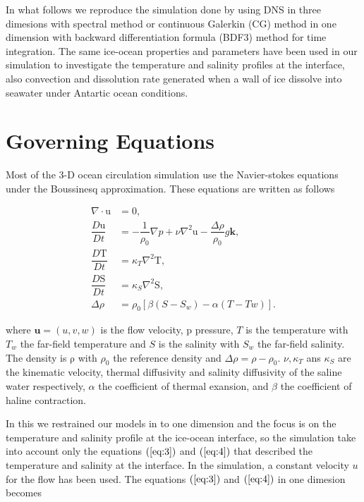 \documentclass[11pt,a4paper]{article}
\begin{document}
	 In what follows we reproduce the simulation done by \cite{gayen2016simulation} using DNS in three dimesions with spectral method or continuous Galerkin (CG) method in one dimension with backward differentiation formula (BDF3) method for time integration. The same ice-ocean properties and parameters have been used in our simulation to investigate the temperature and salinity profiles at the interface, also convection and dissolution rate generated when a wall of ice dissolve into seawater under Antartic ocean conditions.
	
	
	\section{Governing Equations}
	
	Most of the 3-D ocean circulation simulation use the Navier-stokes equations under the Boussinesq approximation. These equations are written as follows
	
	\begin{align}
		\nabla\cdot\mathrm{u} &= 0,\\
		\dfrac{D\mathrm{u}}{Dt} & = -\dfrac{1}{\rho_0}\nabla p + \nu\nabla^2\mathrm{u} - \dfrac{\Delta\rho}{\rho_0}g\mathbf{k},\\
		\dfrac{D\mathrm{T}}{Dt} & = \kappa_T\nabla^2\mathrm{T} ,\\ \label{eq:3}
		\dfrac{D\mathrm{S}}{Dt} & = \kappa_S\nabla^2\mathrm{S} ,\\ \label{eq:4}
		\Delta\rho &=\rho_0\left[ \beta(S-S_w) - \alpha(T-Tw)\right].
	\end{align}

	where $\mathbf{u} = (u,v,w)$ is the flow velocity, $\mathrm{p}$ pressure, $T$ is the temperature with $T_w$ the far-field temperature and $S$ is the salinity with $S_w$ the far-field salinity. The density is $\mathrm{\rho}$ with $\rho_0$ the reference density and $\Delta \rho = \rho-\rho_0$. $\nu, \kappa_T$ ans $\kappa_S$ are the kinematic velocity, thermal diffusivity and salinity diffusivity of the saline water respectively, $\alpha$  the coefficient of thermal exansion, and $\beta$ the coefficient of haline contraction.
	
	In this we restrained our models in to one dimension and the focus is on the temperature and salinity profile at the ice-ocean interface, so the simulation take into account only the equations $(\ref{eq:3})$ and $(\ref{eq:4})$ that described the temperature and salinity at the interface. In the simulation, a constant velocity $u$ for the flow has been used. The equations $(\ref{eq:3})$ and $(\ref{eq:4})$ in one dimesion becomes
	
\end{document}
